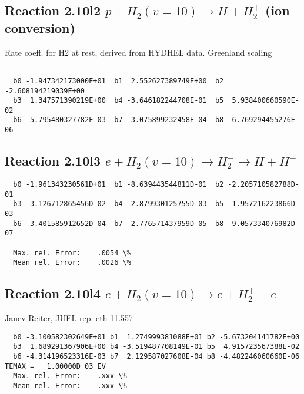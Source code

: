 \documentclass[12pt,dvipdfmx]{article}
\begin{document}
\subsection{
Reaction 2.10l2
$ p + H_2(v=10) \rightarrow H + H_2^+$ (ion conversion)
}
Rate coeff. for H2 at rest, derived from HYDHEL data. Greenland scaling


\begin{small}\begin{verbatim}

  b0 -1.947342173000E+01  b1  2.552627389749E+00  b2 -2.608194219039E+00
  b3  1.347571390219E+00  b4 -3.646182244708E-01  b5  5.938400660590E-02
  b6 -5.795480327782E-03  b7  3.075899232458E-04  b8 -6.769294455276E-06

\end{verbatim}\end{small}

\newpage

\subsection{
Reaction 2.10l3
 $ e + H_2(v=10) \rightarrow H_2^- \rightarrow H + H^-$
}


\begin{small}\begin{verbatim}
  b0 -1.961343230561D+01  b1 -8.639443544811D-01  b2 -2.205710582788D-01
  b3  3.126712865456D-02  b4  2.879930125755D-03  b5 -1.957216223866D-03
  b6  3.401585912652D-04  b7 -2.776571437959D-05  b8  9.057334076982D-07

  Max. rel. Error:    .0054 \%
  Mean rel. Error:    .0026 \%
\end{verbatim}\end{small}

\subsection{
Reaction 2.10l4
 $ e + H_2(v=10) \rightarrow e + H_2^+  + e$
}
Janev-Reiter, JUEL-rep. eth 11.557

\begin{small}\begin{verbatim}
  b0 -3.100582302649E+01 b1  1.274999381088E+01 b2 -5.673204141782E+00
  b3  1.689291367906E+00 b4 -3.519487708149E-01 b5  4.915723567388E-02
  b6 -4.314196523316E-03 b7  2.129587027608E-04 b8 -4.482246060660E-06
TEMAX =   1.00000D 03 EV
  Max. rel. Error:    .xxx \%
  Mean rel. Error:    .xxx \%
\end{verbatim}\end{small}
\end{document}
